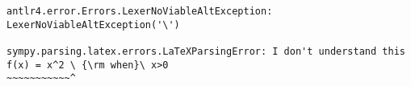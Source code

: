 \begin{verbatim}
antlr4.error.Errors.LexerNoViableAltException: LexerNoViableAltException('\')

sympy.parsing.latex.errors.LaTeXParsingError: I don't understand this
f(x) = x^2 \ {\rm when}\ x>0
~~~~~~~~~~~^
\end{verbatim}